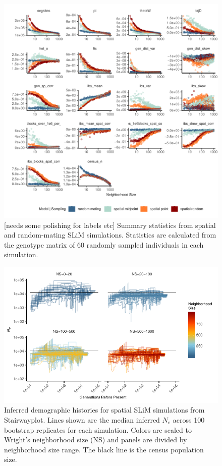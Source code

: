 \documentclass[9pt,twocolumn,twoside,lineno]{gsajnl}
\begin{document}
\begin{figure}[p]
\centering
\includegraphics[width=\textwidth]{sumstats_by_neighbors.pdf}
\caption{[needs some polishing for labels etc] Summary statistics from spatial and random-mating SLiM simulations. Statistics are calculated from the genotype matrix of 60 randomly sampled individuals in each simulation.}
\label{fig:spectrum}
\end{figure}

\afterpage{\clearpage}
\begin{figure}[p]
\centering
\includegraphics[width=\textwidth]{stairwayplot_by_sigma_facets.pdf}
\caption{Inferred demographic histories for spatial SLiM simulations from Stairwayplot. Lines shown are the median inferred $N_{e}$ across 100 bootstrap replicates for each simulation. Colors are scaled to Wright's neighborhood size (NS) and panels are divided by neighborhood size range. The black line is the census population size.}
\label{fig:spectrum}
\end{figure}
\end{document}
